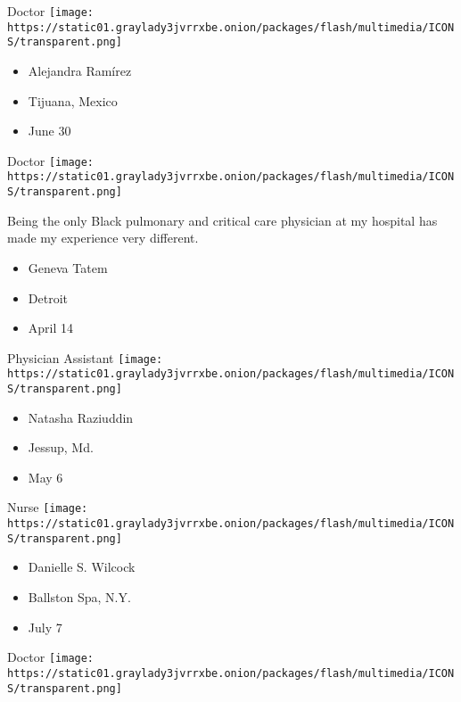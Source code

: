 \protect\hyperlink{item-alejandra-ramirez}{}

Doctor
\texttt{[image: https://static01.graylady3jvrrxbe.onion/packages/flash/multimedia/ICONS/transparent.png]}

\begin{itemize}
\tightlist
\item
  Alejandra Ramírez
\item
  Tijuana, Mexico
\item
  June 30
\end{itemize}

\protect\hyperlink{item-geneva-tatem}{}

Doctor
\texttt{[image: https://static01.graylady3jvrrxbe.onion/packages/flash/multimedia/ICONS/transparent.png]}

Being the only Black pulmonary and critical care physician at my
hospital has made my experience very different.

\begin{itemize}
\tightlist
\item
  Geneva Tatem
\item
  Detroit
\item
  April 14
\end{itemize}

\protect\hyperlink{item-natasha-raziuddin}{}

Physician Assistant
\texttt{[image: https://static01.graylady3jvrrxbe.onion/packages/flash/multimedia/ICONS/transparent.png]}

\begin{itemize}
\tightlist
\item
  Natasha Raziuddin
\item
  Jessup, Md.
\item
  May 6
\end{itemize}

\protect\hyperlink{item-danielle-s-wilcock}{}

Nurse
\texttt{[image: https://static01.graylady3jvrrxbe.onion/packages/flash/multimedia/ICONS/transparent.png]}

\begin{itemize}
\tightlist
\item
  Danielle S. Wilcock
\item
  Ballston Spa, N.Y.
\item
  July 7
\end{itemize}

\protect\hyperlink{item-anil-magge}{}

Doctor
\texttt{[image: https://static01.graylady3jvrrxbe.onion/packages/flash/multimedia/ICONS/transparent.png]}

